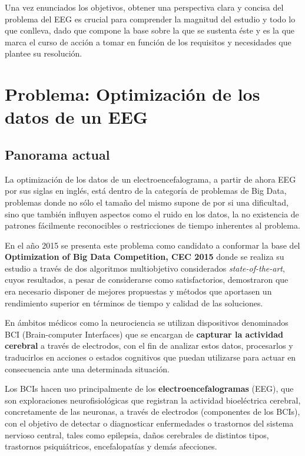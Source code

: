 Una vez enunciados los objetivos, obtener una perspectiva clara y concisa del problema del EEG es crucial para comprender la magnitud del estudio y todo lo que conlleva, dado que compone la base sobre la que se sustenta éste y es la que marca el curso de acción a tomar en función de los requisitos y necesidades que plantee su resolución. 

\section{Problema: Optimización de los datos de un EEG}\label{Section:QEEG}

\subsection{Panorama actual}

La optimización de los datos de un electroencefalograma, a partir de ahora EEG por sus siglas en inglés, está dentro de la categoría de problemas de Big Data, problemas donde no sólo el tamaño del mismo supone de por si una dificultad, sino que también influyen aspectos como el ruido en los datos, la no existencia de patrones fácilmente reconocibles o restricciones de tiempo inherentes al problema.

En el año 2015 se presenta este problema como candidato a conformar la base del \textbf{Optimization of Big Data Competition, CEC 2015}\cite{EvolutionaryBigOpt} donde se realiza su estudio a través de dos algoritmos multiobjetivo considerados \textit{state-of-the-art}, cuyos resultados, a pesar de considerarse como satisfactorios, demostraron que era necesario disponer de mejores propuestas y métodos que aportasen un rendimiento superior en términos de tiempo y calidad de las soluciones.

En ámbitos médicos como la neurociencia se utilizan dispositivos denominados BCI (Brain-computer Interfaces)\cite{BCI} que se encargan de \textbf{capturar la actividad cerebral} a través de electrodos, con el fin de analizar estos datos, procesarlos y traducirlos en acciones o estados cognitivos que puedan utilizarse para actuar en consecuencia ante una determinada situación.

Los BCIs hacen uso principalmente de los \textbf{electroencefalogramas} (EEG), que son exploraciones neurofisiológicas que registran la actividad bioeléctrica cerebral, concretamente de las neuronas, a través de electrodos (componentes de los BCIs), con el objetivo de detectar o diagnosticar enfermedades o trastornos del sistema nervioso central\cite{EEG}, tales como epilepsia, daños cerebrales de distintos tipos, trastornos psiquiátricos, encefalopatías y demás afecciones\cite{EEG2}. 

